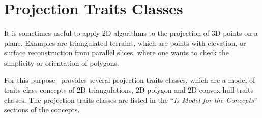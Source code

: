 \section{Projection Traits Classes \label{section-projection-traits}}

It is sometimes useful to apply 2D algorithms to the projection of 3D points on
a plane. Examples are
triangulated terrains, which are points with elevation, or surface 
reconstruction from parallel slices, where one wants to check the simplicity
or orientation of polygons.

For this purpose \cgal\ provides several projection traits classes,
which are a model of traits class concepts of 2D triangulations,
2D polygon and 2D convex hull traits classes.  The projection traits classes 
are listed in the ``{\em Is Model for the Concepts}'' sections of the concepts. 
